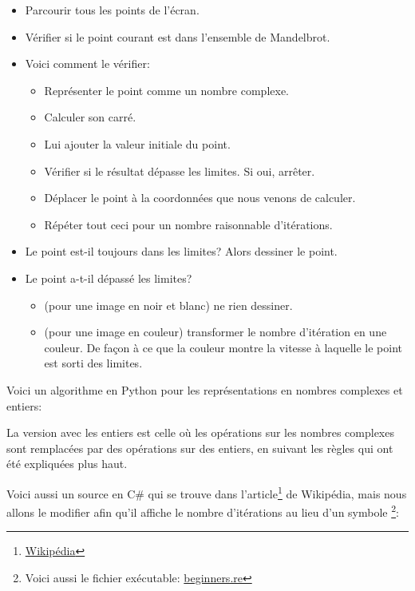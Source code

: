 \begin{itemize}
\item Parcourir tous les points de l'écran.
\item Vérifier si le point courant est dans l'ensemble de Mandelbrot.
\item Voici comment le vérifier:

  \begin{itemize}
  \item Représenter le point comme un nombre complexe.
  \item Calculer son carré.
  \item Lui ajouter la valeur initiale du point.
  \item Vérifier si le résultat dépasse les limites. Si oui, arrêter.
  \item Déplacer le point à la coordonnées que nous venons de calculer.
  \item Répéter tout ceci pour un nombre raisonnable d'itérations.
  \end{itemize}

\item Le point est-il toujours dans les limites? Alors dessiner le point.

\item Le point a-t-il dépassé les limites?

  \begin{itemize}
    \item (pour une image en noir et blanc) ne rien dessiner.
    \item 
(pour une image en couleur) transformer le nombre d'itération en une couleur.
     De façon à ce que la couleur montre la vitesse à laquelle le point est sorti
des limites.
  \end{itemize}

\end{itemize}

%
Voici un algorithme en Python pour les représentations en nombres complexes et entiers:




La version avec les entiers est celle où les opérations sur les nombres complexes
sont remplacées par des opérations sur des entiers, en suivant les règles qui ont
été expliquées plus haut.



Voici aussi un source en C\# qui se trouve dans l'article\footnote{\href{http://go.yurichev.com/17307}{Wikipédia}}
de Wikipédia, mais nous allons le modifier afin qu'il affiche le nombre d'itérations au lieu d'un symbole
\footnote{Voici aussi le fichier exécutable: 
\href{http://go.yurichev.com/17163}{beginners.re}}:

